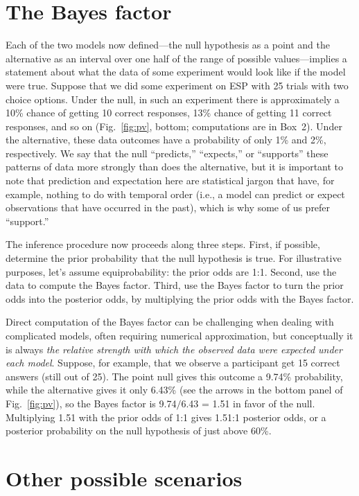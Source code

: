 \section*{The Bayes factor}
Each of the two models now defined---the null hypothesis as a point and the alternative as an interval over one half of the range of possible values---implies a statement about what the data of some experiment would look like if the model were true.  Suppose that we did some experiment on ESP with 25 trials with two choice options.  Under the null, in such an experiment there is approximately a 10\% chance of getting 10 correct responses, 13\% chance of getting 11 correct responses, and so on (Fig.~\ref{fig:pv}, bottom; computations are in Box~2).  Under the alternative, these data outcomes have a probability of only 1\% and 2\%, respectively.  We say that the null ``predicts,'' ``expects,'' or ``supports'' these patterns of data more strongly than does the alternative, but it is important to note that prediction and expectation here are statistical jargon that have, for example, nothing to do with temporal order (i.e., a model can predict or expect observations that have occurred in the past), which is why some of us prefer ``support.''

The inference procedure now proceeds along three steps. First, if possible, determine the prior probability that the null hypothesis is true. For illustrative purposes, let's assume equiprobability: the prior odds are 1:1. Second, use the data to compute the Bayes factor. Third, use the Bayes factor to turn the prior odds into the posterior odds, by multiplying the prior odds with the Bayes factor.

Direct computation of the Bayes factor can be challenging when dealing with complicated models, often requiring numerical approximation, but conceptually it is always \emph{the relative strength with which the observed data were expected under each model}. Suppose, for example, that we observe a participant get 15 correct answers (still out of 25). The point null gives this outcome a 9.74\% probability, while the alternative gives it only 6.43\% (see the arrows in the bottom panel of Fig.~\ref{fig:pv}), so the Bayes factor is 9.74$/$6.43 = 1.51 in favor of the null. Multiplying 1.51 with the prior odds of 1:1 gives 1.51:1 posterior odds, or a posterior probability on the null hypothesis of just above 60\%.

\section*{Other possible scenarios}

